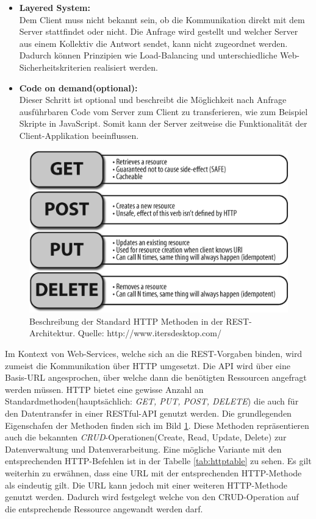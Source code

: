 \documentclass[fleqn,10.5pt,ngerman]{SelfArx}
\begin{document}
\begin{itemize}
	\item \textbf{Layered System:}\\ Dem Client muss nicht bekannt sein, ob die Kommunikation direkt mit dem Server stattfindet oder nicht. Die Anfrage wird gestellt und welcher Server aus einem Kollektiv die Antwort sendet, kann nicht zugeordnet werden. Dadurch können Prinzipien wie Load-Balancing und unterschiedliche Web-Sicherheitskriterien realisiert werden. 
	\item \textbf{Code on demand(optional):}\\ Dieser Schritt ist optional und beschreibt die Möglichkeit nach Anfrage ausführbaren Code vom Server zum Client zu transferieren, wie zum Beispiel Skripte in JavaScript. Somit kann der Server zeitweise die Funktionalität der Client-Applikation beeinflussen.
\end{itemize} 
\begin{figure}[ht]\centering
	\includegraphics[width=8.5 cm]{Abbildungen/RESTful-operations}
	\caption{Beschreibung der Standard HTTP Methoden in der REST-Architektur. Quelle: http://www.itersdesktop.com/}
	\label{fig:restCalls}
\end{figure}
Im Kontext von Web-Services, welche sich an die REST-Vorgaben binden, wird zumeist die Kommunikation über HTTP umgesetzt. Die API wird über eine Basis-URL angesprochen, über welche dann die benötigten Ressourcen angefragt werden müssen. HTTP bietet eine gewisse Anzahl an Standardmethoden(hauptsächlich: \textit{GET, PUT, POST, DELETE}) die auch für den Datentransfer in einer RESTful-API genutzt werden. Die grundlegenden Eigenschafen der Methoden finden sich im Bild \ref{fig:restCalls}. Diese Methoden repräsentieren auch die bekannten \textit{CRUD}-Operationen(Create, Read, Update, Delete) zur Datenverwaltung und Datenverarbeitung. Eine mögliche Variante mit den entsprechenden HTTP-Befehlen ist in der Tabelle \ref{tab:httptable} zu sehen. Es gilt weiterhin zu erwähnen, dass eine URL mit der entsprechenden HTTP-Methode als eindeutig gilt. Die URL kann jedoch mit einer weiteren HTTP-Methode genutzt werden. Dadurch wird festgelegt welche von den CRUD-Operation auf die entsprechende Ressource angewandt werden darf. 
\end{document}
